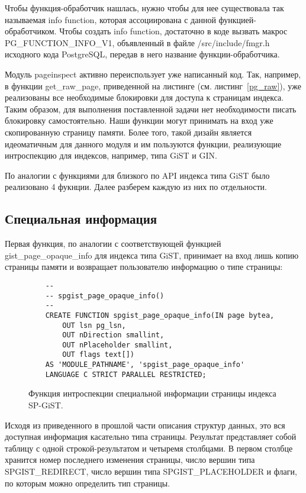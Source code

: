 \documentclass[12pt,oneside]{amsart}
\begin{document}
Чтобы функция-обработчик нашлась, нужно чтобы для нее существовала так называемая info function, которая ассоциирована с данной функцией-обработчиком. Чтобы создать info function, достаточно в коде вызвать макрос PG\_FUNCTION\_INFO\_V1, объявленный в файле /src/include/fmgr.h исходного кода PostgreSQL, передав в него название функции-обработчика.

Модуль pageinspect активно переиспользует уже написанный код. Так, например, в функции get\_raw\_page, приведенной на листинге (см. листинг~\ref{pg_raw}), уже реализованы все необходимые блокировки для доступа к страницам индекса. Таким образом, для выполнения поставленной задачи нет необходимости писать блокировку самостоятельно. Наши функции могут принимать на вход уже скопированную страницу памяти. Более того, такой дизайн является идеоматичным для данного модуля и им пользуются функции, реализующие интроспекцию для индексов, например, типа GiST и GIN.

По аналогии с функциями для близкого по API индекса типа GiST было реализовано 4 фукнции. Далее разберем каждую из них по отдельности.


\subsection{Специальная информация}

Первая функция, по аналогии с соответствующей функцией gist\_page\_opaque\_info для индекса типа GiST, принимает на вход лишь копию страницы памяти и возвращает пользователю информацию о типе страницы:

\begin{figure}[ht!]
\begin{lstlisting}
	--
	-- spgist_page_opaque_info()
	--
	CREATE FUNCTION spgist_page_opaque_info(IN page bytea,
		OUT lsn pg_lsn,
		OUT nDirection smallint,
		OUT nPlaceholder smallint,
		OUT flags text[])
	AS 'MODULE_PATHNAME', 'spgist_page_opaque_info'
	LANGUAGE C STRICT PARALLEL RESTRICTED;
\end{lstlisting}
\caption{Функция интроспекции специальной информации страницы индекса SP-GiST.}\label{my_opaque}
\end{figure}

Исходя из приведенного в прошлой части описания структур данных, это вся доступная информация касательно типа страницы. Результат представляет собой таблицу с одной строкой-результатом и четыремя столбцами. В первом столбце хранится номер последнего изменения страницы, число вершин типа SPGIST\_REDIRECT, число вершин типа SPGIST\_PLACEHOLDER и флаги, по которым можно определить тип страницы.
\end{document}
